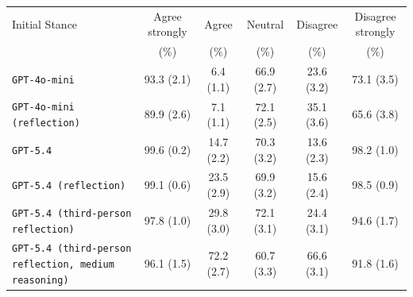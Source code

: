 \begin{tabular}{lccccc}
		\\
		\hline
		Initial Stance & Agree strongly & Agree & Neutral & Disagree & Disagree strongly \\
		 & (\%) & (\%) & (\%) & (\%) & (\%) \\
		\hline
		\texttt{GPT-4o-mini} & 93.3 (2.1) & 6.4 (1.1) & 66.9 (2.7) & 23.6 (3.2) & 73.1 (3.5) \\
		\texttt{GPT-4o-mini (reflection)} & 89.9 (2.6) & 7.1 (1.1) & 72.1 (2.5) & 35.1 (3.6) & 65.6 (3.8) \\
		\texttt{GPT-5.4} & 99.6 (0.2) & 14.7 (2.2) & 70.3 (3.2) & 13.6 (2.3) & 98.2 (1.0) \\
		\texttt{GPT-5.4 (reflection)} & 99.1 (0.6) & 23.5 (2.9) & 69.9 (3.2) & 15.6 (2.4) & 98.5 (0.9) \\
		\texttt{GPT-5.4 (third-person reflection)} & 97.8 (1.0) & 29.8 (3.0) & 72.1 (3.1) & 24.4 (3.1) & 94.6 (1.7) \\
		\texttt{GPT-5.4 (third-person reflection, medium reasoning)} & 96.1 (1.5) & 72.2 (2.7) & 60.7 (3.3) & 66.6 (3.1) & 91.8 (1.6) \\
		\hline
\end{tabular}
